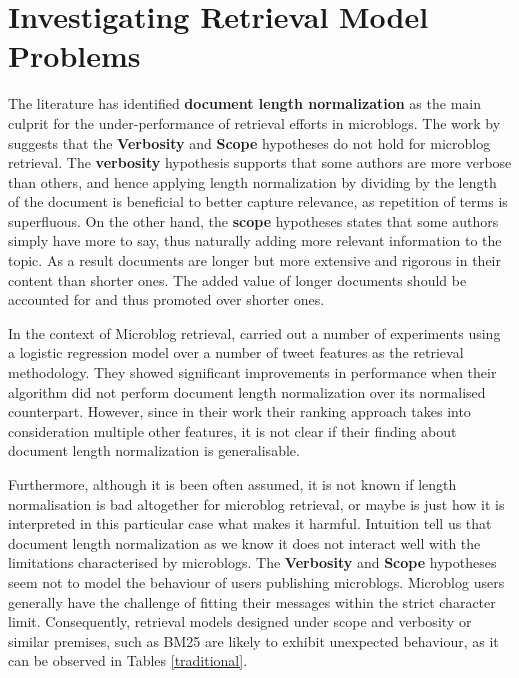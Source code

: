 \section{Investigating Retrieval Model Problems}
\label{RMinvestigation}
The literature has identified \textbf{document length normalization} as the main culprit for the under-performance of retrieval efforts in microblogs. The work by \cite{naveed2011searching} suggests that the \textbf{Verbosity} and \textbf{Scope} hypotheses do not hold for microblog retrieval. The \textbf{verbosity} hypothesis supports that some authors are more verbose than others, and hence applying length normalization by dividing by the length of the document is beneficial to better capture relevance, as repetition of terms is superfluous. On the other hand, the \textbf{scope} hypotheses states that some authors simply have more to say, thus naturally adding more relevant information to the topic. As a result documents are longer but more extensive and rigorous in their content than shorter ones. The added value of longer documents should be accounted for and thus promoted over shorter ones.

In the context of Microblog retrieval, \cite{naveed2011searching} carried out a number of experiments using a logistic regression model over a number of tweet features as the retrieval methodology. They showed significant improvements in performance when their algorithm did not perform document length normalization over its normalised counterpart. However, since in their work their ranking approach takes into consideration multiple other features, it is not clear if their finding about document length normalization is generalisable.

Furthermore, although it is been often assumed, it is not known if length normalisation is bad altogether for microblog retrieval, or maybe is just how it is interpreted in this particular case what makes it harmful. Intuition tell us that document length normalization as we know it does not interact well with the limitations characterised by microblogs. The \textbf{Verbosity} and \textbf{Scope} hypotheses seem not to model the behaviour of users publishing microblogs. Microblog users generally have the challenge of fitting their messages within the strict character limit. Consequently, retrieval models designed under scope and verbosity or similar premises, such as BM25 \cite{robertson2009probabilistic} are likely to exhibit unexpected behaviour, as it can be observed in Tables \ref{traditional}.

